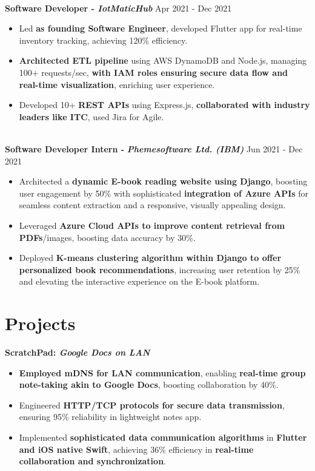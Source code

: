\documentclass[a4paper,10pt]{article}
\begin{document}
\vspace{-8pt}
\textbf{\\ Software Developer - \textit{IotMaticHub}} \hfill Apr 2021 - Dec 2021
\begin{itemize}
    \item Led \textbf{as founding Software Engineer}, developed Flutter app for real-time inventory tracking, achieving 120\% efficiency.
    \item \textbf{Architected ETL pipeline} using AWS DynamoDB and Node.js, managing 100+ requests/sec, \textbf{with IAM roles ensuring secure data flow and real-time visualization}, enriching user experience.
    \item Developed 10+ \textbf{REST APIs} using Express.js, \textbf{collaborated with industry leaders like ITC}, used Jira for Agile.
\end{itemize}
\vspace{-8pt}
\textbf{\\Software Developer Intern - }\textbf{\textit{Phemesoftware Ltd. (IBM)}} \hfill Jun 2021 - Dec 2021
\vspace{2pt}
\begin{itemize}
    \item Architected a \textbf{dynamic E-book reading website using Django}, boosting user engagement by 50\% with sophisticated \textbf{integration of Azure APIs} for seamless content extraction and a responsive, visually appealing design.
    \item Leveraged \textbf{Azure Cloud APIs to improve content retrieval from PDFs}/images, boosting data accuracy by 30\%.
    \item Deployed \textbf{K-means clustering algorithm within Django to offer personalized book recommendations}, increasing user retention by 25\% and elevating the interactive experience on the E-book platform.
\end{itemize}

\vspace{-10pt}
\section*{Projects}
\vspace{-3pt}
\textbf{ScratchPad: \textit{Google Docs on LAN}}
\begin{itemize}
    \item \textbf{Employed mDNS for LAN communication}, enabling \textbf{real-time group note-taking akin to Google Docs}, boosting collaboration by 40\%.
    \item Engineered \textbf{HTTP/TCP protocols for secure data transmission}, ensuring 95\% reliability in lightweight notes app.
    \item Implemented \textbf{sophisticated data communication algorithms} in \textbf{Flutter and iOS native Swift}, achieving 36\% efficiency in \textbf{real-time collaboration and synchronization}.
\end{itemize}
\end{document}
